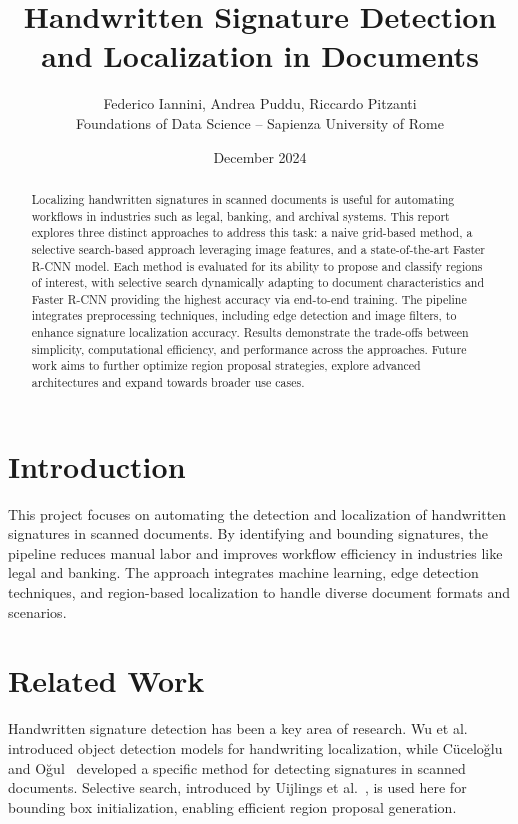 \documentclass[a4paper,12pt]{article}
\begin{document}
\title{Handwritten Signature Detection and Localization in Documents}
\author{Federico Iannini, Andrea Puddu, Riccardo Pitzanti \\
\small Foundations of Data Science – Sapienza University of Rome}
\date{December 2024}
\maketitle

\begin{abstract}
Localizing handwritten signatures in scanned documents is useful for automating workflows in industries such as legal, banking, and archival systems. This report explores three distinct approaches to address this task: a naive grid-based method, a selective search-based approach leveraging image features, and a state-of-the-art Faster R-CNN model. Each method is evaluated for its ability to propose and classify regions of interest, with selective search dynamically adapting to document characteristics and Faster R-CNN providing the highest accuracy via end-to-end training. The pipeline integrates preprocessing techniques, including edge detection and image filters, to enhance signature localization accuracy. Results demonstrate the trade-offs between simplicity, computational efficiency, and performance across the approaches. Future work aims to further optimize region proposal strategies, explore advanced architectures and expand towards broader use cases.
\end{abstract}

\section{Introduction}
This project focuses on automating the detection and localization of handwritten signatures in scanned documents. By identifying and bounding signatures, the pipeline reduces manual labor and improves workflow efficiency in industries like legal and banking. The approach integrates machine learning, edge detection techniques, and region-based localization to handle diverse document formats and scenarios. 

\section{Related Work}
Handwritten signature detection has been a key area of research. Wu et al.~\cite{wu2021} introduced object detection models for handwriting localization, while Cüceloğlu and Oğul~\cite{cuceloglu2018} developed a specific method for detecting signatures in scanned documents. Selective search, introduced by Uijlings et al.~\cite{victor2013}, is used here for bounding box initialization, enabling efficient region proposal generation.
\end{document}
